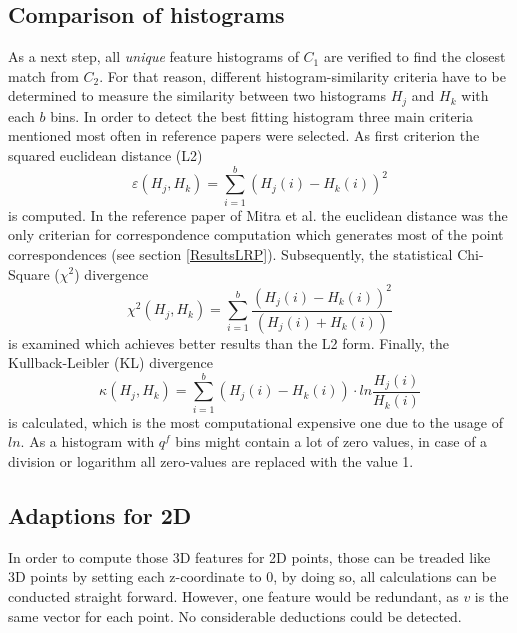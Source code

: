 \subsection{Comparison of histograms}
\label{histogramCriteria}

As a next step, all \textit{unique} feature histograms of $C_1$ are verified to find the closest match from $C_2$. For that reason, different histogram-similarity criteria have to be determined to measure the similarity between two histograms $H_j$ and $H_k$ with each $b$ bins. In order to detect the best fitting histogram three main criteria mentioned most often in reference papers \cite{surfletPairRelation} \cite{localFeatureHistograms} were selected. As first criterion the squared euclidean distance (L2)
\begin{equation}
\varepsilon(H_j, H_k) = \displaystyle\sum_{i=1}^{b}(H_j(i) - H_k(i))^2
\end{equation}
is computed. In the reference paper of Mitra et al. \cite{Mitra07} the euclidean distance was the only criterian for correspondence computation which generates most of the point correspondences (see section \ref{ResultsLRP}). Subsequently, the statistical Chi-Square ($\chi^2$) divergence
\begin{equation}
\chi^2(H_j, H_k) = \displaystyle\sum_{i=1}^{b}\frac{(H_j(i) - H_k(i))^2}{(H_j(i) + H_k(i))}
\end{equation}
is examined which achieves better results than the L2 form. Finally, the Kullback-Leibler (KL) divergence
\begin{equation}
\kappa(H_j, H_k) = \displaystyle\sum_{i=1}^{b}(H_j(i) - H_k(i)) \cdot ln \frac{H_j(i)}{H_k(i)}
\end{equation}
is calculated, which is the most computational expensive one due to the usage of $ln$. As a histogram with $q^f$ bins might contain a lot of zero values, in case of a division or logarithm all zero-values are replaced with the value 1.

\subsection{Adaptions for 2D}
In order to compute those 3D features for 2D points, those can be treaded like 3D points by setting each z-coordinate to 0, by doing so, all calculations can be conducted straight forward. However, one feature would be redundant, as $v$ is the same vector for each point. No considerable deductions could be detected. 

